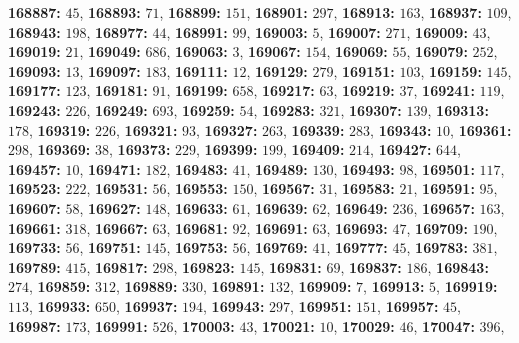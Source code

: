 \textsf{\bfseries 168887:} $45$, \textsf{\bfseries 168893:} $71$, \textsf{\bfseries 168899:} $151$, \textsf{\bfseries 168901:} $297$, \textsf{\bfseries 168913:} $163$, \textsf{\bfseries 168937:} $109$, \textsf{\bfseries 168943:} $198$, \textsf{\bfseries 168977:} $44$, \textsf{\bfseries 168991:} $99$, \textsf{\bfseries 169003:} $5$, \textsf{\bfseries 169007:} $271$, \textsf{\bfseries 169009:} $43$, \textsf{\bfseries 169019:} $21$, \textsf{\bfseries 169049:} $686$, \textsf{\bfseries 169063:} $3$, \textsf{\bfseries 169067:} $154$, \textsf{\bfseries 169069:} $55$, \textsf{\bfseries 169079:} $252$, \textsf{\bfseries 169093:} $13$, \textsf{\bfseries 169097:} $183$, \textsf{\bfseries 169111:} $12$, \textsf{\bfseries 169129:} $279$, \textsf{\bfseries 169151:} $103$, \textsf{\bfseries 169159:} $145$, \textsf{\bfseries 169177:} $123$, \textsf{\bfseries 169181:} $91$, \textsf{\bfseries 169199:} $658$, \textsf{\bfseries 169217:} $63$, \textsf{\bfseries 169219:} $37$, \textsf{\bfseries 169241:} $119$, \textsf{\bfseries 169243:} $226$, \textsf{\bfseries 169249:} $693$, \textsf{\bfseries 169259:} $54$, \textsf{\bfseries 169283:} $321$, \textsf{\bfseries 169307:} $139$, \textsf{\bfseries 169313:} $178$, \textsf{\bfseries 169319:} $226$, \textsf{\bfseries 169321:} $93$, \textsf{\bfseries 169327:} $263$, \textsf{\bfseries 169339:} $283$, \textsf{\bfseries 169343:} $10$, \textsf{\bfseries 169361:} $298$, \textsf{\bfseries 169369:} $38$, \textsf{\bfseries 169373:} $229$, \textsf{\bfseries 169399:} $199$, \textsf{\bfseries 169409:} $214$, \textsf{\bfseries 169427:} $644$, \textsf{\bfseries 169457:} $10$, \textsf{\bfseries 169471:} $182$, \textsf{\bfseries 169483:} $41$, \textsf{\bfseries 169489:} $130$, \textsf{\bfseries 169493:} $98$, \textsf{\bfseries 169501:} $117$, \textsf{\bfseries 169523:} $222$, \textsf{\bfseries 169531:} $56$, \textsf{\bfseries 169553:} $150$, \textsf{\bfseries 169567:} $31$, \textsf{\bfseries 169583:} $21$, \textsf{\bfseries 169591:} $95$, \textsf{\bfseries 169607:} $58$, \textsf{\bfseries 169627:} $148$, \textsf{\bfseries 169633:} $61$, \textsf{\bfseries 169639:} $62$, \textsf{\bfseries 169649:} $236$, \textsf{\bfseries 169657:} $163$, \textsf{\bfseries 169661:} $318$, \textsf{\bfseries 169667:} $63$, \textsf{\bfseries 169681:} $92$, \textsf{\bfseries 169691:} $63$, \textsf{\bfseries 169693:} $47$, \textsf{\bfseries 169709:} $190$, \textsf{\bfseries 169733:} $56$, \textsf{\bfseries 169751:} $145$, \textsf{\bfseries 169753:} $56$, \textsf{\bfseries 169769:} $41$, \textsf{\bfseries 169777:} $45$, \textsf{\bfseries 169783:} $381$, \textsf{\bfseries 169789:} $415$, \textsf{\bfseries 169817:} $298$, \textsf{\bfseries 169823:} $145$, \textsf{\bfseries 169831:} $69$, \textsf{\bfseries 169837:} $186$, \textsf{\bfseries 169843:} $274$, \textsf{\bfseries 169859:} $312$, \textsf{\bfseries 169889:} $330$, \textsf{\bfseries 169891:} $132$, \textsf{\bfseries 169909:} $7$, \textsf{\bfseries 169913:} $5$, \textsf{\bfseries 169919:} $113$, \textsf{\bfseries 169933:} $650$, \textsf{\bfseries 169937:} $194$, \textsf{\bfseries 169943:} $297$, \textsf{\bfseries 169951:} $151$, \textsf{\bfseries 169957:} $45$, \textsf{\bfseries 169987:} $173$, \textsf{\bfseries 169991:} $526$, \textsf{\bfseries 170003:} $43$, \textsf{\bfseries 170021:} $10$, \textsf{\bfseries 170029:} $46$, \textsf{\bfseries 170047:} $396$, 

